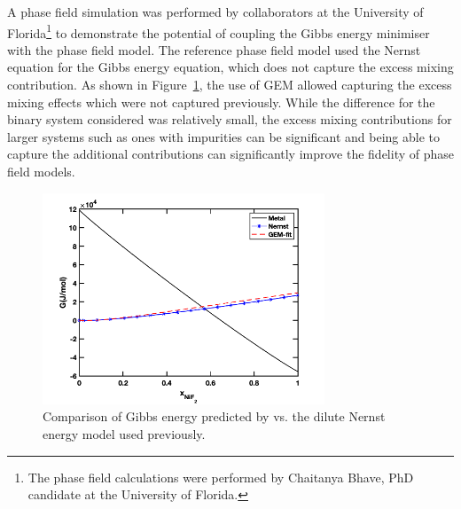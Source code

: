 A phase field simulation was performed by collaborators at the University of Florida\footnote{The phase field calculations were performed by Chaitanya Bhave, PhD candidate at the University of Florida.} to demonstrate the potential of coupling the Gibbs energy minimiser with the phase field model. The reference phase field model used the Nernst equation for the Gibbs energy equation, which does not capture the excess mixing contribution. As shown in Figure~\ref{fig:pfgibbs}, the use of GEM allowed capturing the excess mixing effects which were not captured previously. While the difference for the binary system considered was relatively small, the excess mixing contributions for larger systems such as ones with impurities can be significant and being able to capture the additional contributions can significantly improve the fidelity of phase field models.
    \begin{figure}[ht!]
        \centering
        \includegraphics[width=0.75\textwidth]{figures/chapter-7/gibbs.png}
        \caption{Comparison of Gibbs energy predicted by {\GEM} vs. the dilute Nernst energy model used previously.}
        \label{fig:pfgibbs}
    \end{figure}

